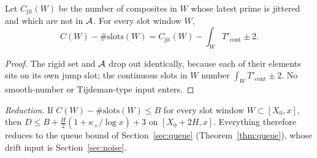 \begin{lemma}\label{lem:excess}
Let $C_{\mathrm{jit}}(W)$ be the number of composites in $W$ whose latest prime is jittered and which are not in $\mathcal{A}$. For every slot
window $W$,
\[
  C(W)-\#\mathrm{slots}(W)=C_{\mathrm{jit}}(W)-\int_WT'_{\mathrm{cont}}\pm2.
\]
\end{lemma}
\begin{proof}
The rigid set and $\mathcal{A}$ drop out identically, because each of their elements sits on its own jump slot; the continuous slots in $W$
number $\int_WT'_{\mathrm{cont}}\pm2$. No smooth-number or Tijdeman-type input enters.
\end{proof}

\emph{Reduction.} If $C(W)-\#\mathrm{slots}(W)\le B$ for every slot window $W\subset[X_0,x]$, then $D\le B+\frac H2(1+\kappa_+/\log x)+3$ on $[X_0+2H,x]$.
Everything therefore reduces to the queue bound of Section~\ref{sec:queue} (Theorem~\ref{thm:queue}), whose drift input is
Section~\ref{sec:noise}.
\par\endgroup
